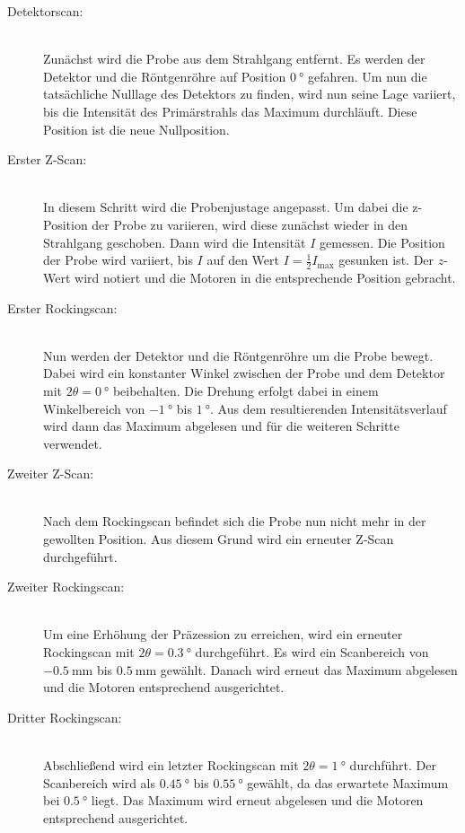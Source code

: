 \begin{description}
    \item[Detektorscan:]\hfill \\
    Zunächst wird die Probe aus dem Strahlgang entfernt. Es werden der Detektor und die Röntgenröhre auf Position $\SI{0}{\degree}$
    gefahren. Um nun die tatsächliche Nulllage des Detektors zu finden, wird nun seine Lage variiert, bis die Intensität des 
    Primärstrahls das Maximum durchläuft. Diese Position ist die neue Nullposition. 
    \item[Erster Z-Scan:]\hfill \\
    In diesem Schritt wird die Probenjustage angepasst. Um dabei die z-Position der Probe zu variieren, wird diese zunächst wieder
    in den Strahlgang geschoben. Dann wird die Intensität $I$ gemessen. Die Position der Probe wird variiert, bis $I$ auf den 
    Wert $I = \frac{1}{2}I_\text{max}$ gesunken ist. Der $z$-Wert wird notiert und die Motoren in die entsprechende Position 
    gebracht.
    \item[Erster Rockingscan:]\hfill \\
    Nun werden der Detektor und die Röntgenröhre um die Probe bewegt. Dabei wird ein konstanter Winkel zwischen der Probe und 
    dem Detektor mit $2\theta = \SI{0}{\degree}$ beibehalten. Die Drehung erfolgt dabei in einem Winkelbereich von $\SI{-1}{\degree}$
    bis $\SI{1}{\degree}$. Aus dem resultierenden Intensitätsverlauf wird dann das Maximum abgelesen und für die weiteren Schritte 
    verwendet. 
    \item[Zweiter Z-Scan:]\hfill\\
    Nach dem Rockingscan befindet sich die Probe nun nicht mehr in der gewollten Position. Aus diesem Grund wird ein erneuter 
    Z-Scan durchgeführt.
    \item[Zweiter Rockingscan:]\hfill\\
    Um eine Erhöhung der Präzession zu erreichen, wird ein erneuter Rockingscan mit $2\theta = \SI{0.3}{\degree}$ durchgeführt. 
    Es wird ein Scanbereich von $\SI{-0.5}{\milli\metre}$ bis $\SI{0.5}{\milli\metre}$ gewählt. Danach wird erneut das Maximum abgelesen
    und die Motoren entsprechend ausgerichtet.
    \item[Dritter Rockingscan:]\hfill\\
    Abschließend wird ein letzter Rockingscan mit $2\theta = \SI{1}{\degree}$ durchführt. Der Scanbereich wird als $\SI{0.45}{\degree}$
    bis $\SI{0.55}{\degree}$ gewählt, da das erwartete Maximum bei $\SI{0.5}{\degree}$ liegt. Das Maximum wird erneut abgelesen und 
    die Motoren entsprechend ausgerichtet.  
    
\end{description}

